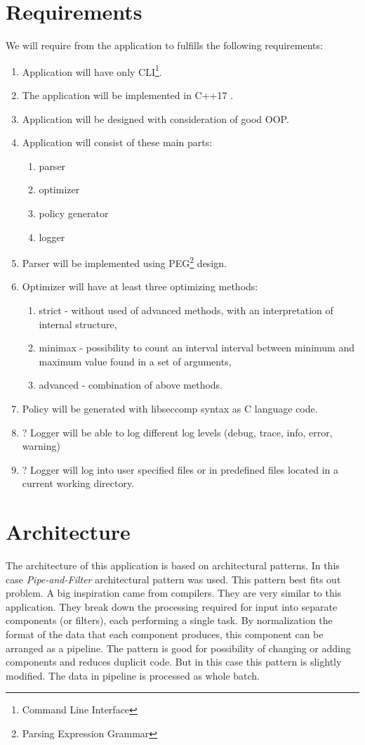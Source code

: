 \section{Requirements}
\label{sec:requirements}
We will require from the application to fulfills the following requirements:
\begin{enumerate}
\item Application will have only CLI\footnote{Command Line Interface}.
\item The application will be implemented in C++17 \cite{ISO14882}.
\item Application will be designed with consideration of good OOP.
\item Application will consist of these main parts:
	\begin{enumerate}
    \item parser
    \item optimizer
    \item policy generator
    \item logger
	\end{enumerate}
\item Parser will be implemented using PEG\footnote{Parsing Expression Grammar} \cite{PEG_def} design.
\item Optimizer will have at least three optimizing methods:
	\begin{enumerate}
    \item strict - without used of advanced methods, with an interpretation of internal structure,
    \item minimax - possibility to  count an interval interval between minimum and maximum value found in a set of arguments,
    \item advanced - combination of above methods.
	\end{enumerate}
\item Policy will be generated with libseccomp \cite{libseccomp_git} syntax as C language \cite{ISO9899} code.
\item ? Logger will be able to log different log levels (debug, trace, info, error, warning)
\item ? Logger will log into user specified files or in predefined files located in a current working directory.
\end{enumerate}

\section{Architecture}
The architecture of this application is based on architectural patterns.
In this case \textit{Pipe-and-Filter} \cite{PipeAndFilter} architectural pattern was used.
This pattern best fits out problem.
A big inspiration came from compilers.
They are very similar to this application.
They break down the processing required for input into separate components (or filters), each performing a single task.
By normalization the format of the data that each component produces, this component can be arranged as a pipeline.
The pattern is good for possibility of changing or adding components and reduces duplicit code.
But in this case this pattern is slightly modified.
The data in pipeline is processed as whole batch.

